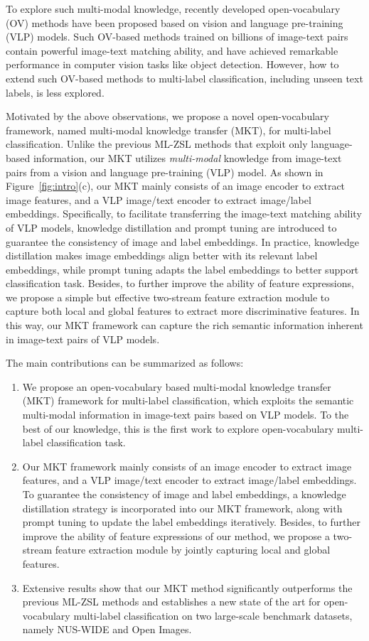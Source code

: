 \documentclass[letterpaper]{article} %
\begin{document}
To explore such multi-modal knowledge, recently developed open-vocabulary (OV) methods \cite{openvild, opensedo, openseg, openprompt, liang2022mind} have been proposed  based on vision and language pre-training (VLP) models.
Such OV-based methods trained on billions of image-text pairs contain powerful image-text matching ability, and have achieved remarkable performance in computer vision tasks like object detection.
However,  how to extend such OV-based methods  to multi-label classification, including unseen text labels, is less explored.
\par
Motivated by the above observations,
we propose a novel open-vocabulary framework, named multi-modal knowledge transfer (MKT), for multi-label classification.
Unlike the previous ML-ZSL methods that exploit only language-based information, our MKT utilizes \textit{multi-modal} knowledge from image-text pairs from a  vision and language pre-training (VLP) model.
As shown in Figure~\ref{fig:intro}(c), our MKT mainly consists of an image encoder to extract image features,  and a VLP image/text encoder
to extract image/label embeddings.
Specifically,
to facilitate transferring the image-text matching ability of VLP models,
knowledge distillation and prompt tuning are introduced to guarantee the consistency of image and label embeddings.
In practice, knowledge distillation  makes image embeddings align better with its relevant label embeddings, while prompt tuning adapts the label embeddings to better support classification task.
Besides, to further improve the ability of feature  expressions,
we propose a simple but effective two-stream feature extraction module to capture both local and global features to extract more discriminative features.
In this way, our MKT framework can capture the rich semantic information inherent in image-text pairs of VLP models.
\par
The main contributions can be summarized as follows:
\begin{enumerate}
    \item We propose an open-vocabulary based multi-modal knowledge transfer (MKT) framework for multi-label classification, which exploits the semantic multi-modal information in image-text pairs based on VLP models.
    To the best of our knowledge, this is the first work to explore open-vocabulary multi-label classification task.
    \item Our MKT framework mainly consists of an image encoder to extract image features, and a VLP image/text encoder to extract image/label embeddings.
    To guarantee the consistency of image and label embeddings, a knowledge distillation strategy is incorporated into our MKT framework, along with prompt tuning to update the label embeddings iteratively.   Besides, to further improve the ability of feature expressions of our method,
    we propose a two-stream feature extraction module by  jointly capturing local and global features.
    \item Extensive results show that our MKT method significantly outperforms the previous ML-ZSL methods and establishes a new state of the art for open-vocabulary multi-label classification on two large-scale benchmark datasets, namely NUS-WIDE and Open Images.
\end{enumerate}
\end{document}
